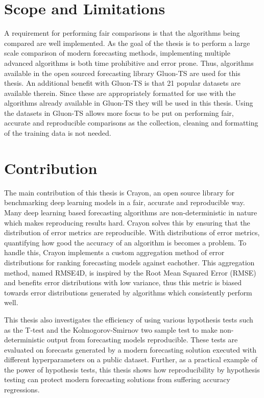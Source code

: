 \section{Scope and Limitations}
A requirement for performing fair comparisons is that the algorithms being compared are well implemented. As the goal of the thesis is to perform a large scale comparison of modern forecasting methods, implementing multiple advanced algorithms is both time prohibitive and error prone. Thus, algorithms available in the open sourced forecasting library Gluon-TS are used for this thesis. An additional benefit with Gluon-TS is that 21 popular datasets are available therein. Since these are appropriately formatted for use with the algorithms already available in Gluon-TS they will be used in this thesis. Using the datasets in Gluon-TS allows more focus to be put on performing fair, accurate and reproducible comparisons as the collection, cleaning and formatting of the training data is not needed.

\section{Contribution}
\label{section:contribution}

The main contribution of this thesis is Crayon, an open source library for benchmarking deep learning models in a fair, accurate and reproducible way. Many deep learning based forecasting algorithms are non-deterministic in nature which makes reproducing results hard. Crayon solves this by ensuring that the distribution of error metrics are reproducible. With distributions of error metrics, quantifying how good the accuracy of an algorithm is becomes a problem. To handle this, Crayon implements a custom aggregation method of error distributions for ranking forecasting models against eachother. This aggregation method, named RMSE4D, is inspired by the Root Mean Squared Error (RMSE) \cite{hyndman_forecasting_3rd} and benefits error distributions with low variance, thus this metric is biased towards error distributions generated by algorithms which consistently perform well.

This thesis also investigates the efficiency of using various hypothesis tests such as the T-test \cite{student_or_welch} and the Kolmogorov-Smirnov two sample test \cite{massey1951kolmogorov} to make non-deterministic output from forecasting models reproducible. These tests are evaluated on forecasts generated by a modern forecasting solution executed with different hyperparameters on a public dataset. Further, as a practical example of the power of hypothesis tests, this thesis shows how reproducibility by hypothesis testing can protect modern forecasting solutions from suffering accuracy regressions.


